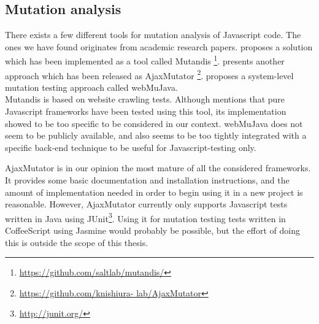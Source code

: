 \subsection{Mutation analysis}
\label{sec:choices_mutation}

There exists a few different tools for mutation analysis of Javascript
code. The ones we have found originates from academic research papers.
\citet{paper:mutandis} proposes a solution which has been implemented as
a tool called Mutandis
\footnote{\url{https://github.com/saltlab/mutandis/}}.
\citet{paper:ajaxmutator} presents another approach which has been
released as AjaxMutator \footnote{\url{https://github.com/knishiura-
lab/AjaxMutator}}. \citet{paper:webmujava} proposes a system-level
mutation testing approach called webMuJava.\\

Mutandis is based on website crawling tests. Although
\citeauthor{paper:mutandis} mentions that pure Javascript frameworks
have been tested using this tool, its implementation showed to be too
specific to be considered in our context. webMuJava does not seem to be
publicly available, and also seems to be too tightly integrated with a
specific back-end technique to be useful for Javascript-testing only.

AjaxMutator is in our opinion the most mature of all the considered
frameworks. It provides some basic documentation and installation
instructions, and the amount of implementation needed in order to begin
using it in a new project is reasonable. However, AjaxMutator currently
only supports Javascript tests written in Java using
JUnit\footnote{\url{http://junit.org/}}. Using it for mutation testing
tests written in CoffeeScript using Jasmine would probably be possible,
but the effort of doing this is outside the scope of this thesis.\\
